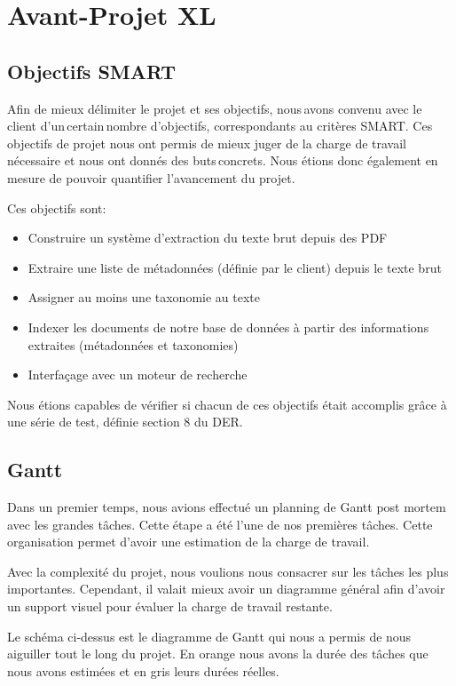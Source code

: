 
\section{Avant-Projet XL}

\subsection{Objectifs SMART}
Afin de mieux délimiter le projet et ses objectifs, nous avons convenu avec le client d'un certain nombre d'objectifs, correspondants au critères SMART\@.
Ces objectifs de projet nous ont permis de mieux juger de la charge de travail nécessaire et nous ont donnés des buts concrets.
Nous étions donc également en mesure de pouvoir quantifier l'avancement du projet.

Ces objectifs sont:
\begin{itemize}
\item Construire un système d'extraction du texte brut depuis des PDF
\item Extraire une liste de métadonnées (définie par le client) depuis le texte brut
\item Assigner au moins une taxonomie au texte
\item Indexer les documents de notre base de données à partir des informations extraites (métadonnées et taxonomies)
\item Interfaçage avec un moteur de recherche
\end{itemize}


Nous étions capables de vérifier si chacun de ces objectifs était accomplis grâce à une série de test, définie section 8 du DER\@.


\subsection{Gantt}
Dans un premier temps, nous avions effectué un planning de Gantt post mortem avec les grandes tâches.
Cette étape a été l'une de nos premières tâches.
Cette organisation permet d’avoir une estimation de la charge de travail.

Avec la complexité du projet, nous voulions nous consacrer sur les tâches les plus importantes.
Cependant, il valait mieux avoir un diagramme général afin d’avoir un support visuel pour évaluer la charge de travail restante.




Le schéma ci-dessus est le diagramme de Gantt qui nous a permis de nous aiguiller tout le long du projet.
En orange nous avons la durée des tâches que nous avons estimées et en gris leurs durées réelles. 

